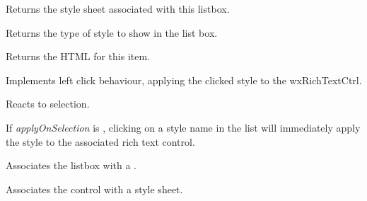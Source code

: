 
Returns the style sheet associated with this listbox.

\label{wxrichtextstylelistboxgetstyletype}


Returns the type of style to show in the list box.

\label{wxrichtextstylelistboxongetitem}


Returns the HTML for this item.

\label{wxrichtextstylelistboxonleftdown}


Implements left click behaviour, applying the clicked style to the wxRichTextCtrl.

\label{wxrichtextstylelistboxonselect}


Reacts to selection.

\label{wxrichtextstylelistboxsetapplyonselection}


If {\it applyOnSelection} is \true, clicking on a style name in the list will immediately
apply the style to the associated rich text control.

\label{wxrichtextstylelistboxsetrichtextctrl}


Associates the listbox with a .

\label{wxrichtextstylelistboxsetstylesheet}


Associates the control with a style sheet.

